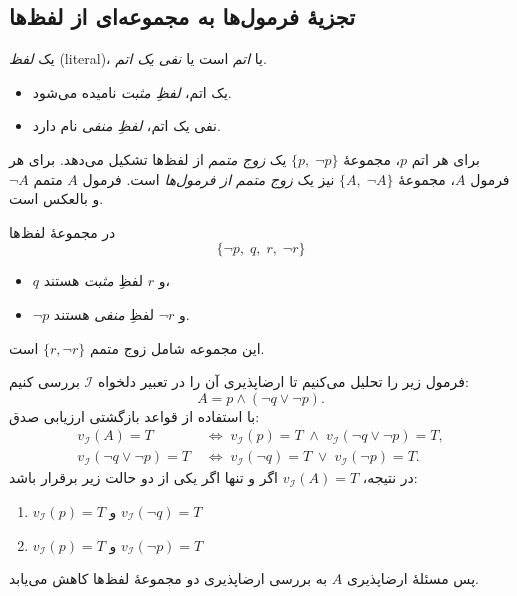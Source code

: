 \subsection*{ تجزیهٔ فرمول‌ها به مجموعه‌ای از لفظ‌ها}
  \begin{definition}[تعریف \lr{2.57}]
    یک \emph{لفظ} (literal)، یا \emph{اتم} است یا \emph{نفی یک اتم}.
    \begin{itemize}
      \item یک اتم، \emph{لفظِ مثبت} نامیده می‌شود.
      \item نفی یک اتم، \emph{لفظِ منفی} نام دارد.
    \end{itemize}
    برای هر اتم $p$، مجموعهٔ $\{p,\;\neg p\}$ یک \emph{زوج متمم} از لفظ‌ها تشکیل می‌دهد.  
    برای هر فرمول $A$، مجموعهٔ $\{A,\;\neg A\}$ نیز یک \emph{زوج متمم از فرمول‌ها} است.  
    فرمول $A$ متمم $\neg A$ و بالعکس است.
  \end{definition}
    
  \begin{example}[مثال \lr{2.58}]
    در مجموعهٔ لفظ‌ها
    \[
    \{\neg p,\; q,\; r,\; \neg r\}
    \]
    \begin{itemize}
      \item $q$ و $r$ لفظِ \emph{مثبت} هستند،
      \item $\neg p$ و $\neg r$ لفظِ \emph{منفی} هستند.
    \end{itemize}
    این مجموعه شامل زوج متمم $\{r,\neg r\}$ است.
  \end{example}
    
  \begin{example}[مثال \lr{2.59}]
    فرمول زیر را تحلیل می‌کنیم تا ارضاپذیری آن را در تعبیر دلخواه $\mathscr{I}$ بررسی کنیم:
    \[
    A = p \land (\neg q \lor \neg p).
    \]
    با استفاده از قواعد بازگشتی ارزیابی صدق:
    \begin{align*}
    v_{\mathscr{I}}(A)=T
    &\;\Longleftrightarrow\;
    v_{\mathscr{I}}(p)=T
    \;\land\;
    v_{\mathscr{I}}(\neg q\lor\neg p)=T,\\
    v_{\mathscr{I}}(\neg q\lor\neg p)=T
    &\;\Longleftrightarrow\;
    v_{\mathscr{I}}(\neg q)=T
    \;\lor\;
    v_{\mathscr{I}}(\neg p)=T.
    \end{align*}
    در نتیجه، $v_{\mathscr{I}}(A)=T$ اگر و تنها اگر یکی از دو حالت زیر برقرار باشد:
    \begin{enumerate}
      \item $v_{\mathscr{I}}(p)=T$ و $v_{\mathscr{I}}(\neg q)=T$
      \item $v_{\mathscr{I}}(p)=T$ و $v_{\mathscr{I}}(\neg p)=T$
    \end{enumerate}
    پس مسئلهٔ ارضاپذیری $A$ به بررسی ارضاپذیری دو مجموعهٔ لفظ‌ها کاهش می‌یابد.
  \end{example}
    
